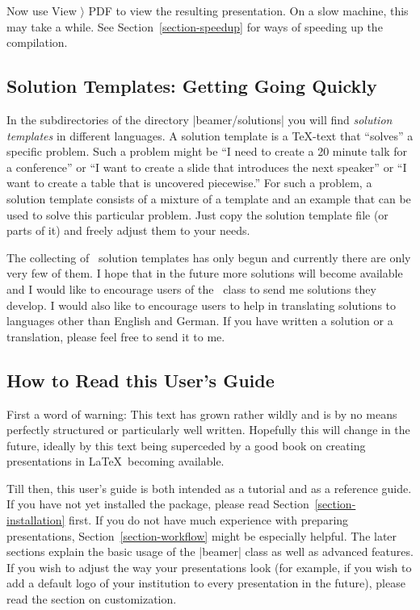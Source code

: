 Now use View $\rangle$ PDF to view the resulting presentation. On a
slow machine, this may take a while. See Section~\ref{section-speedup}
for ways of speeding up the compilation.



\subsection{Solution Templates: Getting Going Quickly}

In the subdirectories of the directory |beamer/solutions| you will
find \emph{solution templates} in different languages. A solution
template is a \TeX-text that ``solves'' a specific problem. Such a
problem might be ``I need to create a 20 minute talk for a
conference'' or ``I want to create a slide that introduces the next
speaker'' or ``I want to create a table that is uncovered piecewise.''
For such a problem, a solution template consists of a mixture of a
template and an example that can be used to solve this particular
problem. Just copy the solution template file (or parts of it) and
freely adjust them to your needs.  

The collecting of \beamer\ solution templates has only begun and
currently there are only very few of them. I hope that in the future
more solutions will become available and I would like to encourage
users of the \beamer\ class to send me solutions they develop. I would
also like to encourage users to help in translating solutions to
languages other than English and German. If you have written a
solution or a translation, please feel free to send it to me.




\subsection{How to Read this User's Guide}

First a word of warning: This text has grown rather wildly and is by
no means perfectly structured or particularly well written. Hopefully
this will change in the future, ideally by this text being superceded
by a good book on creating presentations in \LaTeX\ becoming available.

Till then, this user's guide is both intended as a tutorial and as a
reference guide. If you have not yet installed the package, please read
Section~\ref{section-installation} first. If you do not have much
experience with preparing presentations, 
Section~\ref{section-workflow} might be especially helpful. The later
sections explain the basic usage of the |beamer| class as well as
advanced features. If you wish to adjust the way your presentations
look (for example, if you wish to add a default logo of your
institution to every presentation in the future), please read the
section on customization. 

